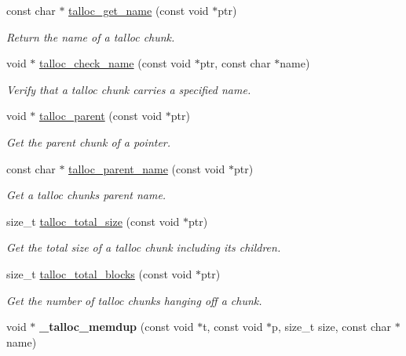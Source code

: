 \begin{DoxyCompactItemize}
\item 
const char $\ast$ \hyperlink{group__talloc_ga854bc4e030677deae1c68d10bb5de31a}{talloc\+\_\+get\+\_\+name} (const void $\ast$ptr)
\begin{DoxyCompactList}\small\item\em Return the name of a talloc chunk. \end{DoxyCompactList}\item 
void $\ast$ \hyperlink{group__talloc_ga1f4f10b2b41c13879fd30cdb30b50862}{talloc\+\_\+check\+\_\+name} (const void $\ast$ptr, const char $\ast$name)
\begin{DoxyCompactList}\small\item\em Verify that a talloc chunk carries a specified name. \end{DoxyCompactList}\item 
void $\ast$ \hyperlink{group__talloc_ga75452866b0cd5c7d5a3a8e7c9dd7a6a5}{talloc\+\_\+parent} (const void $\ast$ptr)
\begin{DoxyCompactList}\small\item\em Get the parent chunk of a pointer. \end{DoxyCompactList}\item 
const char $\ast$ \hyperlink{group__talloc_ga45aec19f076278e5ab25c860951e6ad6}{talloc\+\_\+parent\+\_\+name} (const void $\ast$ptr)
\begin{DoxyCompactList}\small\item\em Get a talloc chunk\textquotesingle{}s parent name. \end{DoxyCompactList}\item 
size\+\_\+t \hyperlink{group__talloc_ga7fdaffb5e7b6ec5ee2a2d94070074338}{talloc\+\_\+total\+\_\+size} (const void $\ast$ptr)
\begin{DoxyCompactList}\small\item\em Get the total size of a talloc chunk including its children. \end{DoxyCompactList}\item 
size\+\_\+t \hyperlink{group__talloc_gabb6eba197e7e2cf57f7f7a5dce21b869}{talloc\+\_\+total\+\_\+blocks} (const void $\ast$ptr)
\begin{DoxyCompactList}\small\item\em Get the number of talloc chunks hanging off a chunk. \end{DoxyCompactList}\item 
\hypertarget{group__talloc_ga0cc5ecd3f28ea75ea67743426170f7d8}{}void $\ast$ {\bfseries \+\_\+talloc\+\_\+memdup} (const void $\ast$t, const void $\ast$p, size\+\_\+t size, const char $\ast$name)\label{group__talloc_ga0cc5ecd3f28ea75ea67743426170f7d8}


\end{DoxyCompactItemize}
